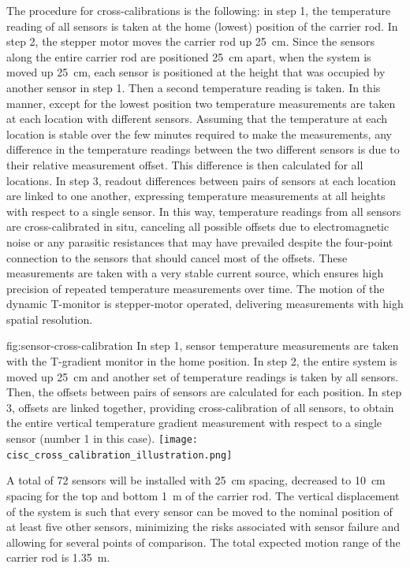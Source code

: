 The procedure for cross-calibrations is the following: in step 1, the temperature reading  of all sensors is taken at the home (lowest) position of the carrier rod. In  step 2, the stepper motor moves the carrier rod up \SI{25}{cm}. Since the sensors along the entire  carrier rod are positioned \SI{25}{cm} apart, when the system is moved up \SI{25}{cm}, each sensor is positioned at the height that was occupied by another sensor in step 1. Then a second temperature reading is taken. In this manner, except for the lowest position two temperature measurements are taken at each location with %
different sensors. Assuming that the temperature at each location is stable over the few minutes required to make the measurements, %
any difference in the temperature readings between the two different sensors is due to their relative measurement offset. This %
difference is then calculated for all locations.  In step 3, readout differences between pairs of sensors at each location are linked to one another, expressing temperature measurements at all heights with respect to a single sensor. In this way, temperature readings from all sensors are cross-calibrated %
in situ, canceling all possible offsets due to electromagnetic noise or any parasitic resistances that may have prevailed despite the four-point connection to the sensors that should cancel most of the offsets. These measurements are taken with a very stable current source, which ensures high precision of repeated temperature measurements over time. The motion of the dynamic T-monitor is stepper-motor operated, delivering measurements with high spatial resolution. 

\begin{dunefigure}{fig:sensor-cross-calibration}
  {In step 1, sensor temperature measurements are taken with the T-gradient monitor in the home position. In step 2, the entire system is moved up \SI{25}{cm} and another set of temperature readings is taken by all sensors. Then, the offsets between pairs of sensors are calculated for each position. In step 3, offsets are linked together, providing cross-calibration of all sensors, to obtain the entire vertical temperature gradient measurement with respect to a single sensor (number 1 in this case). }
  \texttt{[image: cisc\_cross\_calibration\_illustration.png]}%
\end{dunefigure}


A total of \num{72} sensors will be installed with \SI{25}{cm} spacing, decreased to \SI{10}{cm} spacing for the top and bottom \SI{1}{m} of the carrier rod.  
 The vertical displacement of the system is such that every sensor can be moved to the nominal position of at least five other sensors, minimizing the risks associated with sensor failure and allowing for several points of comparison. The total expected motion range of the carrier rod is \SI{1.35}{m}.


